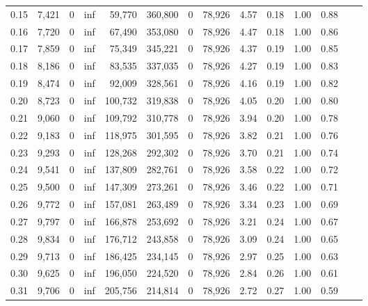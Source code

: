 \begin{tabular}{rrrrrrrrrrrrrr}
0.15 &  7,421 &      0 &      inf &   59,770 &  360,800 &       0 &  78,926 &  4.57 &  0.18 &  1.00 &      0.88 \\
0.16 &  7,720 &      0 &      inf &   67,490 &  353,080 &       0 &  78,926 &  4.47 &  0.18 &  1.00 &      0.86 \\
0.17 &  7,859 &      0 &      inf &   75,349 &  345,221 &       0 &  78,926 &  4.37 &  0.19 &  1.00 &      0.85 \\
0.18 &  8,186 &      0 &      inf &   83,535 &  337,035 &       0 &  78,926 &  4.27 &  0.19 &  1.00 &      0.83 \\
0.19 &  8,474 &      0 &      inf &   92,009 &  328,561 &       0 &  78,926 &  4.16 &  0.19 &  1.00 &      0.82 \\
0.20 &  8,723 &      0 &      inf &  100,732 &  319,838 &       0 &  78,926 &  4.05 &  0.20 &  1.00 &      0.80 \\
0.21 &  9,060 &      0 &      inf &  109,792 &  310,778 &       0 &  78,926 &  3.94 &  0.20 &  1.00 &      0.78 \\
0.22 &  9,183 &      0 &      inf &  118,975 &  301,595 &       0 &  78,926 &  3.82 &  0.21 &  1.00 &      0.76 \\
0.23 &  9,293 &      0 &      inf &  128,268 &  292,302 &       0 &  78,926 &  3.70 &  0.21 &  1.00 &      0.74 \\
0.24 &  9,541 &      0 &      inf &  137,809 &  282,761 &       0 &  78,926 &  3.58 &  0.22 &  1.00 &      0.72 \\
0.25 &  9,500 &      0 &      inf &  147,309 &  273,261 &       0 &  78,926 &  3.46 &  0.22 &  1.00 &      0.71 \\
0.26 &  9,772 &      0 &      inf &  157,081 &  263,489 &       0 &  78,926 &  3.34 &  0.23 &  1.00 &      0.69 \\
0.27 &  9,797 &      0 &      inf &  166,878 &  253,692 &       0 &  78,926 &  3.21 &  0.24 &  1.00 &      0.67 \\
0.28 &  9,834 &      0 &      inf &  176,712 &  243,858 &       0 &  78,926 &  3.09 &  0.24 &  1.00 &      0.65 \\
0.29 &  9,713 &      0 &      inf &  186,425 &  234,145 &       0 &  78,926 &  2.97 &  0.25 &  1.00 &      0.63 \\
0.30 &  9,625 &      0 &      inf &  196,050 &  224,520 &       0 &  78,926 &  2.84 &  0.26 &  1.00 &      0.61 \\
0.31 &  9,706 &      0 &      inf &  205,756 &  214,814 &       0 &  78,926 &  2.72 &  0.27 &  1.00 &      0.59 \\

\end{tabular}
